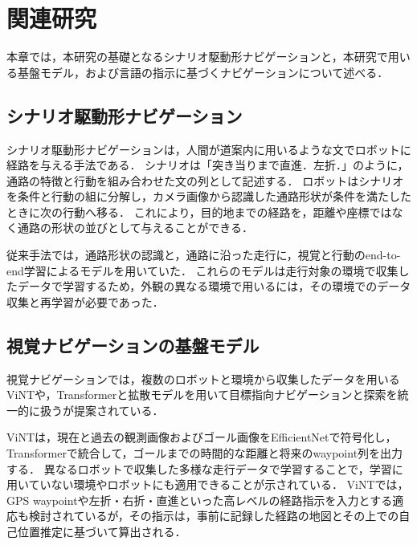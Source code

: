 \chapter{関連研究}
\label{chap:related_work}

本章では，本研究の基礎となるシナリオ駆動形ナビゲーションと，本研究で用いる基盤モデル，および言語の指示に基づくナビゲーションについて述べる．

\section{シナリオ駆動形ナビゲーション}
\label{sec:related_scenario}

シナリオ駆動形ナビゲーション\cite{scenario_si2023}は，人間が道案内に用いるような文でロボットに経路を与える手法である．
シナリオは「突き当りまで直進．左折．」のように，通路の特徴と行動を組み合わせた文の列として記述する．
ロボットはシナリオを条件と行動の組に分解し，カメラ画像から認識した通路形状が条件を満たしたときに次の行動へ移る．
これにより，目的地までの経路を，距離や座標ではなく通路の形状の並びとして与えることができる．

従来手法では，通路形状の認識と，通路に沿った走行に，視覚と行動のend-to-end学習によるモデルを用いていた\cite{scenario_si2023}．
これらのモデルは走行対象の環境で収集したデータで学習するため，外観の異なる環境で用いるには，その環境でのデータ収集と再学習が必要であった．


\section{視覚ナビゲーションの基盤モデル}
\label{sec:related_vnm}

視覚ナビゲーションでは，複数のロボットと環境から収集したデータを用いるViNT\cite{vint}や，Transformerと拡散モデルを用いて目標指向ナビゲーションと探索を統一的に扱う\NoMaD\cite{nomad}が提案されている．

ViNTは，現在と過去の観測画像およびゴール画像をEfficientNet\cite{efficientnet}で符号化し，Transformerで統合して，ゴールまでの時間的な距離と将来のwaypoint列を出力する\cite{vint}．
異なるロボットで収集した多様な走行データで学習することで，学習に用いていない環境やロボットにも適用できることが示されている．
ViNTでは，GPS waypointや左折・右折・直進といった高レベルの経路指示を入力とする適応も検討されているが，その指示は，事前に記録した経路の地図とその上での自己位置推定に基づいて算出される\cite{vint}．

